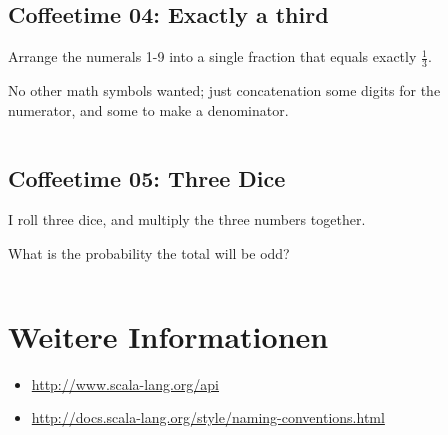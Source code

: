 \inputminted[linenos, numbersep=5pt, tabsize=2, frame=lines, label=01-TwoBases.scala]{scala}{scripts/scala/01-TwoBases.scala}

\subsection{Coffeetime 04: Exactly a third}
Arrange the numerals 1-9 into a single fraction that equals exactly
$\frac{1}{3}$.

No other math symbols wanted; just concatenation some digits for the
numerator, and some to make a denominator.

\inputminted[linenos, numbersep=5pt, tabsize=4, frame=lines, label=04-ExactlyAThird.scala]{scala}{scripts/scala/04-ExactlyAThird.scala}

\subsection{Coffeetime 05: Three Dice}
I roll three dice, and multiply the three numbers together.

What is the probability the total will be odd?

\inputminted[linenos, numbersep=5pt, tabsize=4, frame=lines, label=05-ThreeDice.scala]{scala}{scripts/scala/05-ThreeDice.scala}

\section{Weitere Informationen}
\begin{itemize}
    \item \url{http://www.scala-lang.org/api}
    \item \url{http://docs.scala-lang.org/style/naming-conventions.html}
\end{itemize}


